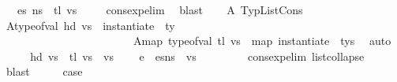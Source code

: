 \begin{isabellebody}
\ {\isachardoublequoteopen}{\isasymLambda}{\isacharcomma}{\kern0pt}{\isasymGamma}{\isacharcomma}{\kern0pt}{\isasymOmega}\ {\isasymturnstile}\ {\isasymlangle}es{\isacharcomma}{\kern0pt}\ n{\isacharunderscore}{\kern0pt}s{\isasymrangle}\ {\isacharbrackleft}{\kern0pt}{\isasymDown}{\isacharbrackright}{\kern0pt}\ tl\ vs{\isachardoublequoteclose}\isanewline
\ \ \ \isamarkupfalse%
\ cons{\isacharunderscore}{\kern0pt}exp{\isacharunderscore}{\kern0pt}elim\ \isamarkupfalse%
\ blast\isanewline
\ \ \isamarkupfalse%
\ A{}\ TypListCons\ \isamarkupfalse%
\ A{}{\isacharcolon}{\kern0pt}{\isachardoublequoteopen}type{\isacharunderscore}{\kern0pt}of{\isacharunderscore}{\kern0pt}val\ {\isacharparenleft}{\kern0pt}hd\ vs{\isacharparenright}{\kern0pt}\ {\isacharequal}{\kern0pt}\ instantiate\ {\isasymOmega}\ ty{\isachardoublequoteclose}\ \isanewline
\ \ \ \ \ \ \ \ \ \ \ \ \ \ \ \ \ \ \ \ \ \ \ \ A{}{\isacharcolon}{\kern0pt}{\isachardoublequoteopen}map\ {\isacharparenleft}{\kern0pt}type{\isacharunderscore}{\kern0pt}of{\isacharunderscore}{\kern0pt}val{\isacharparenright}{\kern0pt}\ {\isacharparenleft}{\kern0pt}tl\ vs{\isacharparenright}{\kern0pt}\ {\isacharequal}{\kern0pt}\ map\ {\isacharparenleft}{\kern0pt}instantiate\ {\isasymOmega}{\isacharparenright}{\kern0pt}\ tys{\isachardoublequoteclose}\ \isamarkupfalse%
\ auto\isanewline
\ \ \isamarkupfalse%
\ \isamarkupfalse%
\ {\isachardoublequoteopen}{\isacharparenleft}{\kern0pt}hd\ vs{\isacharparenright}{\kern0pt}\ {\isacharhash}{\kern0pt}\ {\isacharparenleft}{\kern0pt}tl\ vs{\isacharparenright}{\kern0pt}\ {\isacharequal}{\kern0pt}\ vs{\isachardoublequoteclose}\ \isamarkupfalse%
\ {\isacartoucheopen}{\isasymLambda}{\isacharcomma}{\kern0pt}{\isasymGamma}{\isacharcomma}{\kern0pt}{\isasymOmega}\ {\isasymturnstile}\ {\isasymlangle}{\isacharparenleft}{\kern0pt}e\ {\isacharhash}{\kern0pt}\ es{\isacharparenright}{\kern0pt}{\isacharcomma}{\kern0pt}n{\isacharunderscore}{\kern0pt}s{\isasymrangle}\ {\isacharbrackleft}{\kern0pt}{\isasymDown}{\isacharbrackright}{\kern0pt}\ vs{\isacartoucheclose}\ \isanewline
\ \ \ \ \ \ \isamarkupfalse%
\ cons{\isacharunderscore}{\kern0pt}exp{\isacharunderscore}{\kern0pt}elim\ list{\isachardot}{\kern0pt}collapse\ \isamarkupfalse%
\ blast\isanewline
\ \ \isamarkupfalse%
\ \isamarkupfalse%
\ {\isacharquery}{\kern0pt}case\isanewline

\end{isabellebody}
